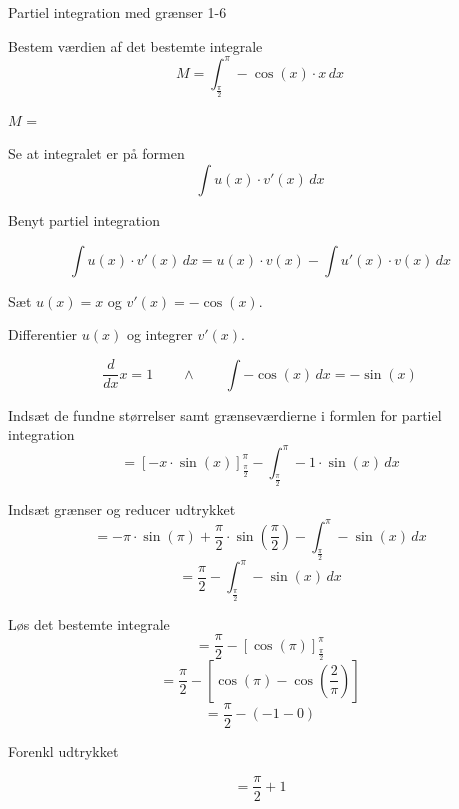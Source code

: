 \documentclass{article}
\begin{document}
\begin{exercise}{Partiel integration med grænser 1-6}


Bestem værdien af det bestemte integrale
\[
M = \int_{\frac{\pi}{2}}^\pi - \cos(x) \cdot x \, dx
\]

$M$ = 


\hint

Se at integralet er på formen
\[
\int u(x) \cdot v'(x) \, dx
\]

\hint

Benyt partiel integration

\hint
\[
\int u(x) \cdot v'(x)\, dx = u(x) \cdot v(x) - \int u'(x) \cdot v(x) \, dx
\]
\hint

Sæt $u(x) = x$ og $v'(x) = - \cos(x)$.


\hint

Differentier $u(x)$ og integrer $v'(x)$.

\hint
\[
\frac{d}{dx}x = 1 \qquad \wedge \qquad \int - \cos(x) \, dx = - \sin(x)
\]

\hint

Indsæt de fundne størrelser samt grænseværdierne i formlen for partiel integration
\[
= \left[-x \cdot \sin(x) \right]_{\frac{\pi}{2}}^{\pi} - \int_{\frac{\pi}{2}}^{\pi} -1 \cdot \sin(x) \, dx
\]

\hint

Indsæt grænser og reducer udtrykket
\[
= - \pi \cdot \sin(\pi) + \frac{\pi}{2} \cdot \sin\left(\frac{\pi}{2}\right) - \int_{\frac{\pi}{2}}^{\pi} - \sin(x) \, dx
\]
\[
= \frac{\pi}{2}- \int_{\frac{\pi}{2}}^{\pi} - \sin(x) \, dx
\]

\hint
Løs det bestemte integrale
\[
= \frac{\pi}{2} - \left[ \cos(\pi) \right]_{\frac{\pi}{2}}^{\pi}
\]
\[
= \frac{\pi}{2} - \left[ \cos(\pi) - \cos\left(\frac{2}{\pi}\right) \right]
\]
\[
= \frac{\pi}{2} - (-1 - 0)
\]

\hint
Forenkl udtrykket

\hint
\[
= \frac{\pi}{2} + 1
\]



\end{exercise}

\newpage
\end{document}
